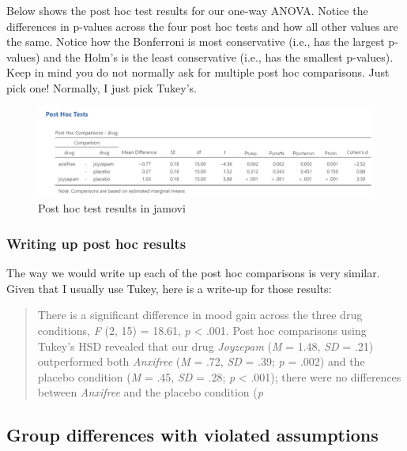 \documentclass[
]{book}
\begin{document}
Below shows the post hoc test results for our one-way ANOVA. Notice the differences in p-values across the four post hoc tests and how all other values are the same. Notice how the Bonferroni is most conservative (i.e., has the largest p-values) and the Holm's is the least conservative (i.e., has the smallest p-values). Keep in mind you do not normally ask for multiple post hoc comparisons. Just pick one! Normally, I just pick Tukey's.

\begin{figure}

{\centering \includegraphics[width=1\linewidth]{images/04_one-way-anova/one-way_results_post-hoc} 

}

\caption{Post hoc test results in jamovi}\label{fig:unnamed-chunk-14}
\end{figure}

\hypertarget{writing-up-post-hoc-results}{%
\subsubsection{Writing up post hoc results}\label{writing-up-post-hoc-results}}

The way we would write up each of the post hoc comparisons is very similar. Given that I usually use Tukey, here is a write-up for those results:

\begin{quote}
There is a significant difference in mood gain across the three drug conditions, \emph{F} (2, 15) = 18.61, \emph{p} \textless{} .001. Post hoc comparisons using Tukey's HSD revealed that our drug \emph{Joyzepam} (\emph{M} = 1.48, \emph{SD} = .21) outperformed both \emph{Anxifree} (\emph{M} = .72, \emph{SD} = .39; \emph{p} = .002) and the placebo condition (\emph{M} = .45, \emph{SD} = .28; \emph{p} \textless{} .001); there were no differences between \emph{Anxifree} and the placebo condition (\emph{p}
\end{quote}

\hypertarget{group-differences-with-violated-assumptions}{%
\subsection{Group differences with violated assumptions}\label{group-differences-with-violated-assumptions}}
\end{document}
